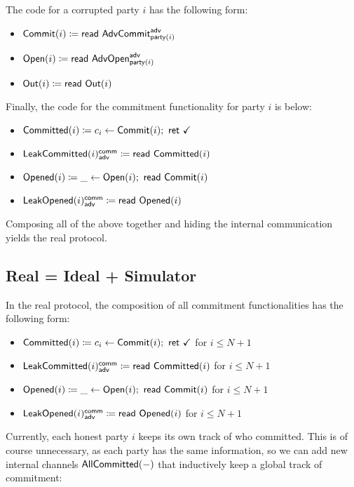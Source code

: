 The code for a corrupted party $i$ has the following form:
\begin{itemize}
\item {\color{blue} $\mathsf{Commit}(i) \coloneqq \mathsf{read} \ \mathsf{AdvCommit}^{\mathsf{adv}}_{\mathsf{party}(i)}$}
\item {\color{teal} $\mathsf{Open}(i) \coloneqq \mathsf{read} \ \mathsf{AdvOpen}^{\mathsf{adv}}_{\mathsf{party}(i)}$}
\item $\mathsf{Out}(i) \coloneqq \mathsf{read} \ \mathsf{Out}(i)$
\end{itemize}
Finally, the code for the commitment functionality for party $i$ is below:
\begin{itemize}
\item {\color{magenta} $\mathsf{Committed}(i) \coloneqq c_i \leftarrow \mathsf{Commit}(i); \ \mathsf{ret} \ \checkmark$}
\item {\color{magenta} $\mathsf{LeakCommitted}(i)^{\mathsf{comm}}_{\mathsf{adv}} \coloneqq \mathsf{read} \ \mathsf{Committed}(i)$}
\item {\color{red} $\mathsf{Opened}(i) \coloneqq \_ \leftarrow \mathsf{Open}(i); \ \mathsf{read} \ \mathsf{Commit}(i)$}
\item {\color{red} $\mathsf{LeakOpened}(i)^{\mathsf{comm}}_{\mathsf{adv}} \coloneqq \mathsf{read} \ \mathsf{Opened}(i)$}
\end{itemize}
Composing all of the above together and hiding the internal communication yields the real protocol.

\subsection{Real = Ideal + Simulator}
In the real protocol, the composition of all commitment functionalities has the following form:

\begin{itemize}
\item {\color{magenta} $\mathsf{Committed}(i) \coloneqq c_i \leftarrow \mathsf{Commit}(i); \ \mathsf{ret} \ \checkmark$ for $i \leq N+1$}
\item {\color{magenta} $\mathsf{LeakCommitted}(i)^{\mathsf{comm}}_{\mathsf{adv}} \coloneqq \mathsf{read} \ \mathsf{Committed}(i)$ for $i \leq N+1$}
\item {\color{red} $\mathsf{Opened}(i) \coloneqq \_ \leftarrow \mathsf{Open}(i); \ \mathsf{read} \ \mathsf{Commit}(i)$ for $i \leq N+1$}
\item {\color{red} $\mathsf{LeakOpened}(i)^{\mathsf{comm}}_{\mathsf{adv}} \coloneqq \mathsf{read} \ \mathsf{Opened}(i)$ for $i \leq N+1$}
\end{itemize}

\noindent Currently, each honest party $i$ keeps its own track of who committed. This is of course unnecessary, as each party has the same information, so we can add new internal channels $\mathsf{AllCommitted}(-)$ that inductively keep a global track of commitment:

